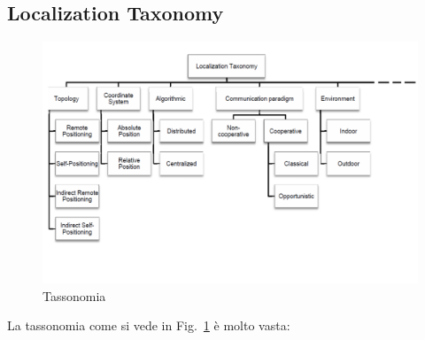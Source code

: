 \documentclass[12pt,a4paper]{article}
\begin{document}
	\subsection{Localization Taxonomy}\label{subsec3.3}
	\begin{figure}
		\centering
		\includegraphics[scale=0.5]{fig1-lec3pt1.png}			
		\caption{Tassonomia}
		\label{fig:fig1-lec3pt1}
	\end{figure}	
	La tassonomia come si vede in Fig.~\ref{fig:fig1-lec3pt1} è molto vasta:
\end{document}

